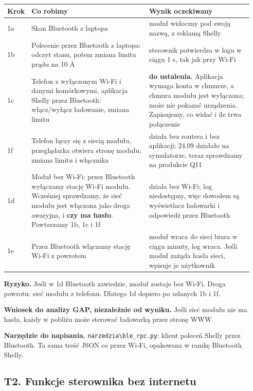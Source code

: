 \documentclass[11pt,a4paper]{article}
\begin{document}
\begin{longtable}{>{\raggedright\arraybackslash}p{3.00cm}>{\raggedright\arraybackslash}p{6.14cm}>{\raggedright\arraybackslash}p{6.14cm}}
\toprule
\rowcolor{apteallight}\textbf{Krok} & \textbf{Co robimy} & \textbf{Wynik oczekiwany} \\
\midrule\endhead
\bottomrule\endfoot
1a & Skan Bluetooth z laptopa & moduł widoczny pod swoją nazwą, z reklamą Shelly \\
1b & Polecenie przez Bluetooth z laptopa: odczyt stanu, potem zmiana limitu prądu na 10 A & sterownik potwierdza w logu w ciągu 1 s, tak jak przy Wi-Fi \\
1c & Telefon z wyłączonym Wi-Fi i danymi komórkowymi, aplikacja Shelly przez Bluetooth: włącz/wyłącz ładowanie, zmiana limitu & \textbf{do ustalenia.} Aplikacja wymaga konta w chmurze, a chmura modułu jest wyłączona; może nie pokazać urządzenia. Zapisujemy, co widać i ile trwa połączenie \\
1f & Telefon łączy się z siecią modułu, przeglądarka otwiera stronę modułu, zmiana limitu i włącznika & działa bez routera i bez aplikacji; 24.09 działało na symulatorze, teraz sprawdzamy na produkcie Q11 \\
1d & Moduł bez Wi-Fi: przez Bluetooth wyłączamy stację Wi-Fi modułu. Wcześniej sprawdzamy, że sieć modułu jest włączona jako droga awaryjna, i \textbf{czy ma hasło}. Powtarzamy 1b, 1c i 1f & działa bez Wi-Fi; log niedostępny, więc dowodem są wyświetlacz ładowarki i odpowiedź przez Bluetooth \\
1e & Przez Bluetooth włączamy stację Wi-Fi z powrotem & moduł wraca do sieci biura w ciągu minuty, log wraca. Jeśli moduł zażąda hasła sieci, wpisuje je użytkownik \\
\end{longtable}

\textbf{Ryzyko.} Jeśli w 1d Bluetooth zawiedzie, moduł zostaje bez Wi-Fi. Droga powrotu: sieć modułu z telefonu. Dlatego 1d dopiero po udanych 1b i 1f.


\textbf{Wniosek do analizy GAP, niezależnie od wyniku.} Jeśli sieć modułu nie ma hasła, każdy w pobliżu może sterować ładowarką przez stronę WWW.


\textbf{Narzędzie do napisania.} \texttt{narzedzia\textbackslash{}ble\_\allowbreak{}rpc.\allowbreak{}py}: klient poleceń Shelly przez Bluetooth. Ta sama treść JSON co przez Wi-Fi, opakowana w ramkę Bluetooth Shelly.


\subsection{T2. Funkcje sterownika bez internetu}
\end{document}
